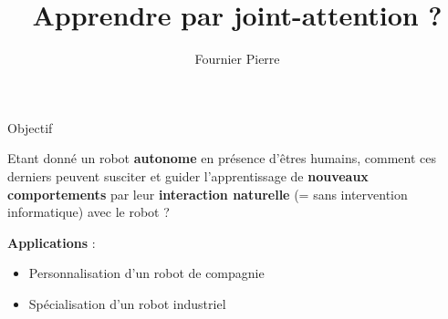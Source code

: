 \documentclass[xcolor=pst,dvips,12pt,english,french]{beamer}
\title{Apprendre par joint-attention ?}
\author{Fournier Pierre}
\begin{document}
	\frame{\titlepage} 
	
	
	\begin{frame}{Objectif}
		\begin{block}{}
			Etant donné un robot \textbf{autonome} en présence d'êtres humains, comment ces derniers peuvent susciter et guider l'apprentissage de \textbf{nouveaux comportements} par leur \textbf{interaction naturelle} (= sans intervention informatique) avec le robot ?
		\end{block}
		\begin{exampleblock}{}
			\textbf{Applications} : 
			\begin{itemize}
				\item Personnalisation d'un robot de compagnie 
				\item Spécialisation d'un robot industriel 
			\end{itemize}
		\end{exampleblock}
	\end{frame}
	
\end{document}
